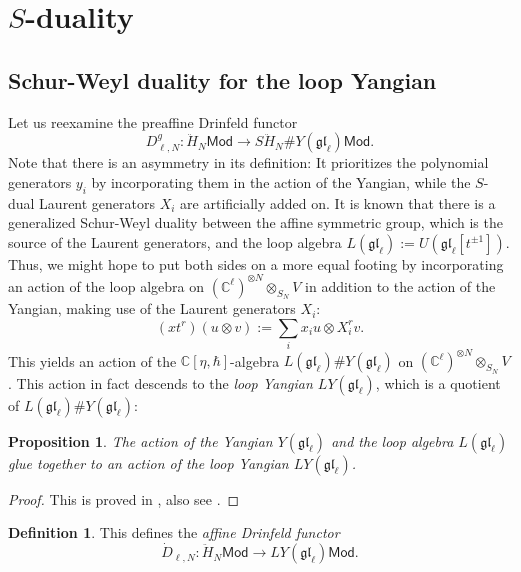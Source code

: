 \documentclass[11pt]{report}
\newtheorem{prop}[theorem]{Proposition}
\theoremstyle{definition}
\newtheorem{definition}[theorem]{Definition}
\theoremstyle{remark}
\theoremstyle{remark}
\newcommand{\C}{\mathbb{C}}
\begin{document}
\section{$S$-duality}

\subsection{Schur-Weyl duality for the loop Yangian}

Let us reexamine the preaffine Drinfeld functor
\begin{equation*}
D_{\ell,N}^g: \ddot H_N\mathsf{Mod} \to S\ddot H_N \# Y(\mathfrak{gl}_\ell) \mathsf{Mod}.
\end{equation*}
Note that there is an asymmetry in its definition: It prioritizes the polynomial generators $y_i$ by incorporating them in the action of the Yangian, while the $S$-dual Laurent generators $X_i$ are artificially added on. It is known that there is a generalized Schur-Weyl duality between the affine symmetric group, which is the source of the Laurent generators, and the loop algebra $L(\mathfrak{gl}_\ell) := U(\mathfrak{gl}_\ell[t^{\pm 1}])$. Thus, we might hope to put both sides on a more equal footing by incorporating an action of the loop algebra on $(\C^\ell)^{\otimes N} \otimes_{S_N} V$ in addition to the action of the Yangian, making use of the Laurent generators $X_i$:
\begin{equation*}
(x t^r)(u \otimes v) := \sum_i x_i u \otimes X_i^r v.
\end{equation*}
This yields an action of the $\C[\eta,\hbar]$-algebra $L(\mathfrak{gl}_\ell) \# Y(\mathfrak{gl}_\ell)$ on $(\C^\ell)^{\otimes N} \otimes_{S_N} V$. This action in fact descends to the \emph{loop Yangian $LY(\mathfrak{gl}_\ell)$}, which is a quotient of $L(\mathfrak{gl}_\ell) \# Y(\mathfrak{gl}_\ell)$:

\begin{prop}
The action of the Yangian $Y(\mathfrak{gl}_\ell)$ and the loop algebra $L(\mathfrak{gl}_\ell)$ glue together to an action of the loop Yangian $LY(\mathfrak{gl}_\ell)$.
\end{prop}

\begin{proof}
This is proved in \cite{article:guay:2005}, also see \cite{article:kodera:2016}.
\end{proof}

\begin{definition}
This defines the \emph{affine Drinfeld functor}
\begin{equation*}
\dot D_{\ell,N}: \ddot H_N\mathsf{Mod} \to LY(\mathfrak{gl}_\ell) \mathsf{Mod}.
\end{equation*}
\end{definition}
\end{document}
